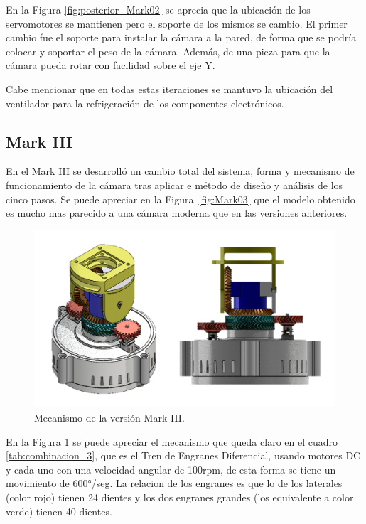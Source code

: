     En la Figura \ref{fig:posterior_Mark02} se aprecia que la ubicación de los servomotores se mantienen pero el soporte de los mismos se cambio. El primer cambio fue el soporte para instalar la cámara a la pared, de forma que se podría colocar y soportar el peso de la cámara. Además, de una pieza para que la cámara pueda rotar con facilidad sobre el eje Y.

    Cabe mencionar que en todas estas iteraciones se mantuvo la ubicación del ventilador para la refrigeración de los componentes electrónicos.

\subsection{Mark III}
    En el Mark III se desarrolló un cambio total del sistema, forma y mecanismo de funcionamiento de la cámara tras aplicar e método de diseño y análisis de los cinco pasos.
    Se puede apreciar en la Figura~\ref{fig:Mark03} que el modelo obtenido es mucho mas parecido a una cámara moderna que en las versiones anteriores.
    
    \begin{figure}[H]
    \centering
    \begin{adjustbox}{width=\linewidth}
      \includegraphics{media/mecanismo_Mark03.png}
    \end{adjustbox}
    \caption{\label{fig:mecanismo_Mark03} Mecanismo de la versión Mark III.}
    \end{figure}

    En la Figura \ref{fig:mecanismo_Mark03} se puede apreciar el mecanismo que queda claro en el cuadro \ref{tab:combinacion_3}, que es el Tren de Engranes Diferencial, usando motores DC y cada uno con una velocidad angular de 100rpm, de esta forma se tiene un movimiento de 600°/seg.
    La relacion de los engranes es que lo de los laterales (color rojo) tienen 24 dientes y los dos engranes grandes (los equivalente a color verde) tienen 40 dientes.

